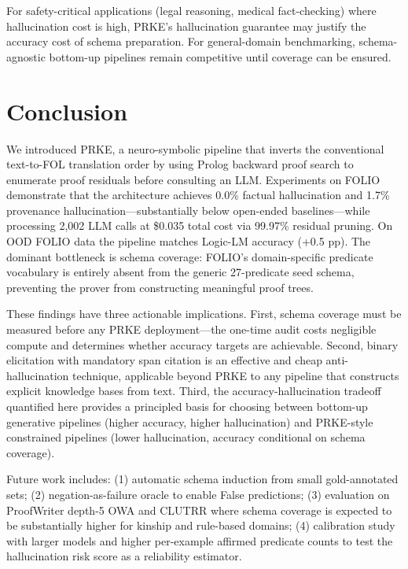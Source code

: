 \documentclass[11pt,letterpaper]{article}
\begin{document}
For safety-critical applications (legal reasoning, medical fact-checking) where hallucination cost is high, PRKE's hallucination guarantee may justify the accuracy cost of schema preparation. For general-domain benchmarking, schema-agnostic bottom-up pipelines remain competitive until coverage can be ensured.

\section{Conclusion}

We introduced PRKE, a neuro-symbolic pipeline that inverts the conventional text-to-FOL translation order by using Prolog backward proof search to enumerate proof residuals before consulting an LLM. Experiments on FOLIO demonstrate that the architecture achieves 0.0\% factual hallucination and 1.7\% provenance hallucination---substantially below open-ended baselines---while processing 2,002 LLM calls at \$0.035 total cost via 99.97\% residual pruning. On OOD FOLIO data the pipeline matches Logic-LM accuracy (+0.5 pp). The dominant bottleneck is schema coverage: FOLIO's domain-specific predicate vocabulary is entirely absent from the generic 27-predicate seed schema, preventing the prover from constructing meaningful proof trees.

These findings have three actionable implications. First, schema coverage must be measured before any PRKE deployment---the one-time audit costs negligible compute and determines whether accuracy targets are achievable. Second, binary elicitation with mandatory span citation is an effective and cheap anti-hallucination technique, applicable beyond PRKE to any pipeline that constructs explicit knowledge bases from text. Third, the accuracy-hallucination tradeoff quantified here provides a principled basis for choosing between bottom-up generative pipelines (higher accuracy, higher hallucination) and PRKE-style constrained pipelines (lower hallucination, accuracy conditional on schema coverage).

Future work includes: (1) automatic schema induction from small gold-annotated sets; (2) negation-as-failure oracle to enable False predictions; (3) evaluation on ProofWriter depth-5 OWA \citep{Tafjord2021} and CLUTRR \citep{Sinha2019} where schema coverage is expected to be substantially higher for kinship and rule-based domains; (4) calibration study with larger models and higher per-example affirmed predicate counts to test the hallucination risk score as a reliability estimator.



\end{document}
